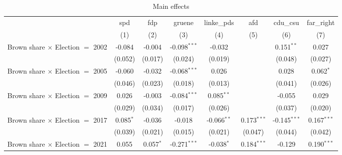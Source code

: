 \begin{table}[htbp]
   \caption{Main effects}
   \centering
   \begin{tabular}{lccccccc}
      \tabularnewline \midrule \midrule
                                                              & spd            & fdp            & gruene                 & linke\_pds     & afd            & cdu\_csu       & far\_right\\   
                                                              & (1)            & (2)            & (3)                    & (4)            & (5)            & (6)            & (7)\\  
      Brown share $\times$ Election $=$ 2002                  & -0.084         & -0.004         & -0.098$^{***}$         & -0.032         &                & 0.151$^{**}$   & 0.027\\   
                                                              & (0.052)        & (0.017)        & (0.024)                & (0.019)        &                & (0.048)        & (0.027)\\   
      Brown share $\times$ Election $=$ 2005                  & -0.060         & -0.032         & -0.068$^{***}$         & 0.026          &                & 0.028          & 0.062$^{*}$\\   
                                                              & (0.046)        & (0.023)        & (0.018)                & (0.013)        &                & (0.041)        & (0.026)\\   
      Brown share $\times$ Election $=$ 2009                  & 0.026          & -0.003         & -0.084$^{***}$         & 0.085$^{**}$   &                & -0.055         & 0.029\\   
                                                              & (0.029)        & (0.034)        & (0.017)                & (0.026)        &                & (0.037)        & (0.020)\\   
      Brown share $\times$ Election $=$ 2017                  & 0.085$^{*}$    & -0.036         & -0.018                 & -0.066$^{**}$  & 0.173$^{***}$  & -0.145$^{***}$ & 0.167$^{***}$\\   
                                                              & (0.039)        & (0.021)        & (0.015)                & (0.021)        & (0.047)        & (0.044)        & (0.042)\\   
      Brown share $\times$ Election $=$ 2021                  & 0.055          & 0.057$^{*}$    & -0.271$^{***}$         & -0.038$^{*}$   & 0.184$^{***}$  & -0.129         & 0.190$^{***}$\\   

\end{tabular}
\end{table}
